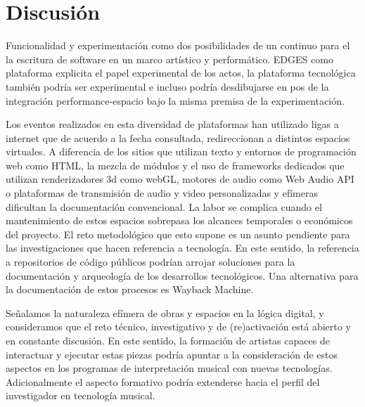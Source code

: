 
\section*{Discusión}

Funcionalidad y experimentación como dos posibilidades de un continuo para el la escritura de software en un marco artístico y performático. EDGES como plataforma explicita el papel experimental de los actos, la plataforma tecnológica también podría ser experimental e incluso podría desdibujarse en pos de la integración performance-espacio bajo la misma premisa de la experimentación. 

Los eventos realizados en esta diversidad de plataformas han utilizado ligas a internet que de acuerdo a la fecha consultada, redireccionan a distintos espacios virtuales. A diferencia de los sitios que utilizan texto y entornos de programación web como HTML, la mezcla de módulos y el uso de frameworks dedicados que utilizan renderizadores 3d como webGL, motores de audio como Web Audio API o plataformas de transmisión de audio y video personalizadas y efímeras dificultan la documentación convencional. La labor se complica cuando el mantenimiento de estos espacios sobrepasa los alcances temporales o económicos del proyecto. El reto metodológico que esto supone es un asunto pendiente para las investigaciones que hacen referencia a tecnología. En este sentido, la referencia a repositorios de código públicos podrían arrojar soluciones para la documentación y arqueología de los desarrollos tecnológicos. Una alternativa para la documentación de estos procesos es Wayback Machine. 

Señalamos la naturaleza efímera de obras y espacios en la lógica digital, y consideramos que el reto técnico, investigativo y de (re)activación está abierto y en constante discusión. En este sentido, la formación de artistas capaces de interactuar y ejecutar estas piezas podría apuntar a la consideración de estos aspectos en los programas de interpretación musical con nuevas tecnologías. Adicionalmente el aspecto formativo podría extenderse hacia el perfil del investigador en tecnología musical.  %


